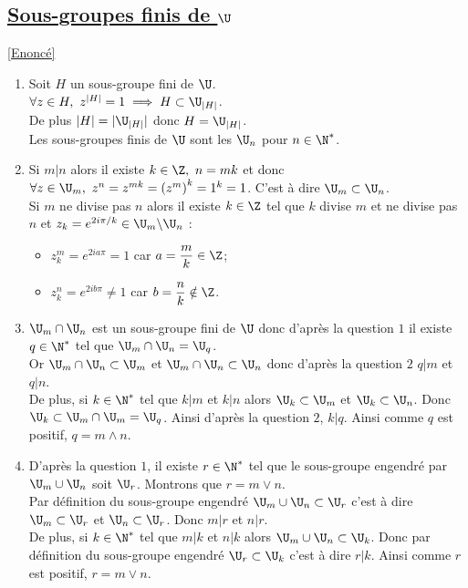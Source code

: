 \documentclass[8pt]{book}
\begin{document}
	\subsection{\underline{Sous-groupes finis de $\U$} }
	\label{Sous-groupes finis de U corrigé}
	\textcolor{blue}{\hyperref[Sous-groupes finis de U]{[Enoncé]}}\\
	\begin{enumerate}[leftmargin=*]
		\item Soit $H$ un sous-groupe fini de $\U$.\\
		$\forall z\in H,\ z^{|H|}=1\implies H\subset \U_{|H|}$.\\
		De plus $|H|=|\U_{|H|}|$ donc $H=\U_{|H|}$.\\
		Les sous-groupes finis de $\U$ sont les $\U_n$ pour $n\in \N^*$.
		\item Si $m|n$ alors il existe $k\in \Z,\ n=mk$ et donc $\forall z\in \U_m,\ z^n=z^{mk}=\left(z^m\right)^k=1^k=1$. C'est à dire $\U_m\subset \U_n$.\\
		Si $m$ ne divise pas $n$ alors il existe $k\in \Z$ tel que $k$ divise $m$ et ne divise pas $n$ et $z_k=e^{2i\pi/k}\in \U_m\backslash \U_n$ :
		\begin{itemize}
			\item $z_k^m=e^{2ia\pi}=1$ car $a=\displaystyle\frac{m}{k}\in \Z$;
			\item $z_k^n=e^{2ib\pi}\ne 1$ car $b=\displaystyle\frac{n}{k}\notin \Z$.
		\end{itemize}
		\item $\U_m\cap \U_n$ est un sous-groupe fini de $\U$ donc d'après la question $1$ il existe $q\in \N^*$ tel que $\U_m\cap \U_n=\U_q$.\\
		Or $\U_m\cap \U_n\subset \U_m$ et $\U_m\cap \U_n\subset \U_n$ donc d'après la question $2$ $q|m$ et $q|n$.\\
		De plus, si $k\in \N^*$ tel que $k|m$ et $k|n$ alors $\U_k\subset \U_m$ et $\U_k\subset \U_n$. Donc $\U_k\subset \U_m\cap\U_m=\U_q$. Ainsi d'après la question $2$, $k|q$. Ainsi comme $q$ est positif, $q=m\wedge n$.
		\item D'après la question $1$, il existe $r\in \N^*$ tel que le sous-groupe engendré par $\U_m\cup \U_n$ soit $\U_r$. Montrons que $r=m\vee n$.\\
		Par définition du sous-groupe engendré $\U_m\cup \U_n\subset \U_r$ c'est à dire $\U_m\subset \U_r$ et $\U_n\subset \U_r$. Donc $m|r$ et $n|r$.\\
		De plus, si $k\in \N^*$ tel que $m|k$ et $n|k$ alors $\U_m\cup \U_n\subset \U_k$. Donc par définition du sous-groupe engendré $\U_r\subset \U_k$ c'est à dire $r|k$. Ainsi comme $r$ est positif, $r=m\vee n$.
	\end{enumerate}
	
\end{document}
